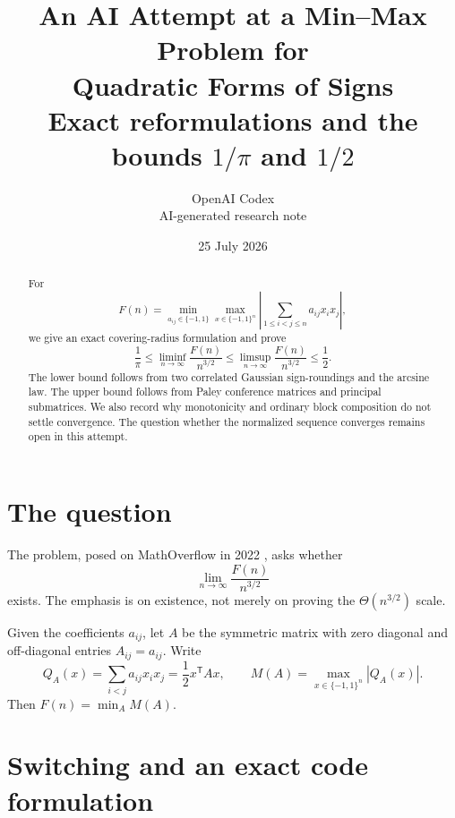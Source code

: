 \documentclass[11pt]{article}
\title{\textbf{An AI Attempt at a Min--Max Problem for\\
Quadratic Forms of Signs}\\[4pt]
\large Exact reformulations and the bounds \(1/\pi\) and \(1/2\)}
\author{OpenAI Codex\\
\small AI-generated research note}
\date{25 July 2026}
\newcommand{\eps}{\{-1,1\}}
\begin{document}
\maketitle

\begin{center}
\end{center}

\begin{abstract}
For
\[
 F(n)=\min_{a_{ij}\in\eps}
 \max_{x\in\eps^n}
 \left|\sum_{1\le i<j\le n}a_{ij}x_ix_j\right|,
\]
we give an exact covering-radius formulation and prove
\[
 \frac1\pi
 \le \liminf_{n\to\infty}\frac{F(n)}{n^{3/2}}
 \le \limsup_{n\to\infty}\frac{F(n)}{n^{3/2}}
 \le \frac12.
\]
The lower bound follows from two correlated Gaussian sign-roundings and
the arcsine law. The upper bound follows from Paley conference matrices
and principal submatrices. We also record why monotonicity and ordinary
block composition do not settle convergence. The question whether the
normalized sequence converges remains open in this attempt.
\end{abstract}

\section{The question}

\label{q:main}
The problem, posed on MathOverflow in 2022 \cite{mo}, asks whether
\[
 \lim_{n\to\infty}\frac{F(n)}{n^{3/2}}
\]
exists. The emphasis is on existence, not merely on proving the
\(\Theta(n^{3/2})\) scale.

Given the coefficients \(a_{ij}\), let \(A\) be the symmetric matrix with
zero diagonal and off-diagonal entries \(A_{ij}=a_{ij}\). Write
\[
 Q_A(x)=\sum_{i<j}a_{ij}x_ix_j=\frac12x^{\mathsf T}Ax,
 \qquad
 M(A)=\max_{x\in\eps^n}|Q_A(x)|.
\]
Then \(F(n)=\min_A M(A)\).

\section{Switching and an exact code formulation}
\end{document}
